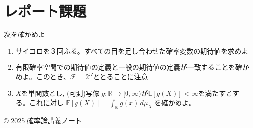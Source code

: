 \documentclass[uplatex,dvipdfmx,11pt,a4paper,openany]{bxjsbook}
\begin{document}
\section{レポート課題}
次を確かめよ

\begin{enumerate}
\item サイコロを３回ふる。すべての目を足し合わせた確率変数の期待値を求めよ
\item 有限確率空間での期待値の定義と一般の期待値の定義が一致することを確かめよ。このとき、$\mathcal F=2^\Omega$ととることに注意
\item $X$を単関数とし, (可測)写像 $g\colon \mathbb{R}\to[0,\infty)$が$\mathbb{E}[g(X)]<\infty$を満たすとする。これに対し
                    $\displaystyle \mathbb{E}[g(X)]=\int_{\mathbb{R}} g(x)\,d\mu_X$ を確かめよ。
\end{enumerate}

© 2025 確率論講義ノート
\end{document}

